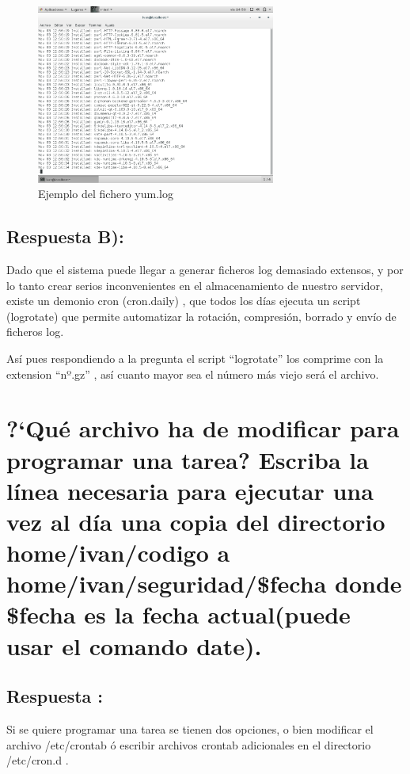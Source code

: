 \begin{figure}[H]
	\begin{center}
		\includegraphics[width=0.7\textwidth]{Imagenes/Fichero_yum_log}
		\caption{Ejemplo del fichero yum.log} \label{fig:4}
	\end{center}
\end{figure}

\subsection{Respuesta B):}

Dado que el sistema puede llegar a generar ficheros log demasiado extensos, y por lo tanto crear serios inconvenientes en el almacenamiento de nuestro servidor, existe un demonio cron (cron.daily)\cite{CRON.DAILY} , que todos los días ejecuta un script (logrotate) que permite automatizar la rotación, compresión, borrado y envío de ficheros log. \cite{Logrotate}

Así pues respondiendo a la pregunta el script ``logrotate'' los comprime con la extension ``nº.gz'' , así cuanto mayor sea el número más viejo será el archivo.\cite{FILElogs}

\section{?`Qué archivo ha de modificar para programar una tarea? Escriba la línea necesaria para ejecutar una vez al día una copia del directorio home/ivan/codigo a  home/ivan/seguridad/\$fecha donde \$fecha es la fecha actual(puede usar el comando date).}
\subsection{Respuesta : }
Si se quiere programar una tarea se tienen dos opciones, o bien modificar el archivo /etc/crontab ó escribir archivos crontab adicionales en el directorio /etc/cron.d . \cite{CRONTAB}

